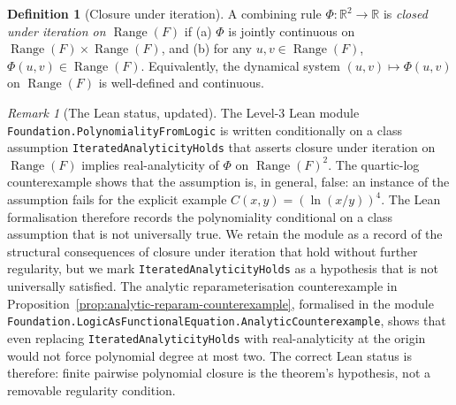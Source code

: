 \documentclass[11pt,a4paper]{article}
\theoremstyle{definition}
\newtheorem{definition}[theorem]{Definition}
\theoremstyle{remark}
\newtheorem{remark}[theorem]{Remark}
\begin{document}
\begin{definition}[Closure under iteration]
\label{def:closure-under-iteration}
A combining rule $\Phi : \mathbb{R}^2 \to \mathbb{R}$ is \emph{closed
under iteration on $\operatorname{Range}(F)$} if (a) $\Phi$ is jointly
continuous on $\operatorname{Range}(F) \times \operatorname{Range}(F)$,
and (b) for any $u, v \in \operatorname{Range}(F)$,
$\Phi(u, v) \in \operatorname{Range}(F)$. Equivalently, the dynamical
system $(u, v) \mapsto \Phi(u, v)$ on $\operatorname{Range}(F)$ is
well-defined and continuous.
\end{definition}

\begin{remark}[The Lean status, updated]
\label{rem:lean-status-update}
The Level-3 Lean module \texttt{Foundation.PolynomialityFromLogic} is
written conditionally on a class assumption
\texttt{IteratedAnalyticityHolds} that asserts closure under iteration
on $\operatorname{Range}(F)$ implies real-analyticity of $\Phi$ on
$\operatorname{Range}(F)^2$. The quartic-log counterexample shows that
the assumption is, in general, false: an instance of the assumption
fails for the explicit example $C(x, y) = (\ln(x/y))^4$. The Lean
formalisation therefore records the polynomiality conditional on a
class assumption that is not universally true. We retain the module as
a record of the structural consequences of closure under iteration
that hold without further regularity, but we mark
\texttt{IteratedAnalyticityHolds} as a hypothesis that is not
universally satisfied. The analytic reparameterisation counterexample
in Proposition~\ref{prop:analytic-reparam-counterexample}, formalised in
the module \texttt{Foundation.LogicAsFunctionalEquation.AnalyticCounterexample},
shows that even replacing \texttt{IteratedAnalyticityHolds} with
real-analyticity at the origin would not force polynomial degree at most
two. The correct Lean status is therefore: finite pairwise polynomial
closure is the theorem's hypothesis, not a removable regularity condition.
\end{remark}
\end{document}
